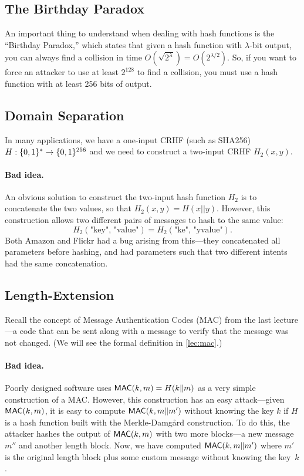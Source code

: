 \subsection{The Birthday Paradox}
An important thing to understand when dealing with hash functions is the ``Birthday Paradox,'' 
which states that given a hash function with $\lambda$-bit output, you can 
always find a collision in time $O(\sqrt{2^\lambda}) = O(2^{\lambda/2})$.
So, if you want to force an attacker to use at least $2^{128}$ to find a collision,
you must use a hash function with at least 256 bits of output.

\subsection{Domain Separation}
In many applications, we have a one-input CRHF (such as SHA256) $H: \{0,1\}^* \rightarrow \{0,1\}^{256}$ 
and we need to construct a two-input CRHF $H_2(x, y)$. 

\paragraph{Bad idea.} An obvious solution to construct the two-input hash function $H_2$ 
is to concatenate the two values, so that $H_2(x, y) = H(x || y)$.
However, this construction allows two different pairs of messages to hash to the same value:
\[H_2(\text{"key", "value"}) = H_2(\text{"ke", "yvalue"}).\]
Both Amazon and Flickr had a bug arising from
this---they concatenated all parameters before
hashing, and had parameters such that two
different intents had the same concatenation.\autocite{flickr}

\subsection{Length-Extension}
Recall the concept of Message Authentication Codes
(MAC) from the last lecture---a code that can be
sent along with a message to verify that the message was not changed.
(We will see the formal definition in \cref{lec:mac}.)

\paragraph{Bad idea.}
Poorly designed software uses $\mathsf{MAC}(k, m) = H(k \| m)$ as a very simple construction of a MAC.
However, this construction has an easy attack---given $\mathsf{MAC}(k, m)$, it is easy to compute $\mathsf{MAC}(k, m\|m')$ 
without knowing the key $k$ if $H$ is a hash function built with the Merkle-Damg\aa{}rd construction.
To do this, the attacker hashes the output of $\mathsf{MAC}(k, m)$ with two more blocks---a new 
message $m''$ and another length block. Now, we
have computed $\mathsf{MAC}(k, m\|m')$ where $m'$ is the
original length block plus some custom message
without knowing the key~$k$. 

